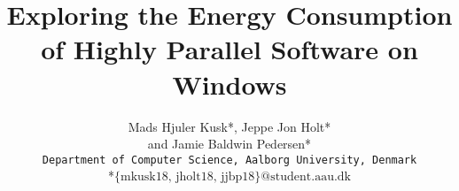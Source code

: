 


\newpage
\title{\huge Exploring the Energy Consumption of Highly Parallel  Software on Windows}
\author{
Mads Hjuler Kusk*, Jeppe Jon Holt*\\ and Jamie Baldwin Pedersen*\\
\texttt{Department of Computer Science, Aalborg University, Denmark}\\
*\texttt{$\text{\{mkusk18, jholt18, jjbp18\}@student.aau.dk}$}
}



















% 


% 

% 



